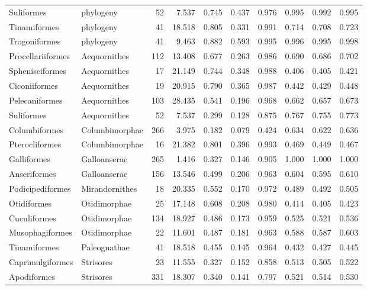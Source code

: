 \begin{longtable}{llrrrrrrrr}
  Suliformes & phylogeny &   52 & 7.537 & 0.745 & 0.437 & 0.976 & 0.995 & 0.992 & 0.995 \\ 
  Tinamiformes & phylogeny &   41 & 18.518 & 0.805 & 0.331 & 0.991 & 0.714 & 0.708 & 0.723 \\ 
  Trogoniformes & phylogeny &   41 & 9.463 & 0.882 & 0.593 & 0.995 & 0.996 & 0.995 & 0.998 \\ 
  Procellariiformes & Aequornithes &  112 & 13.408 & 0.677 & 0.263 & 0.986 & 0.690 & 0.686 & 0.702 \\ 
  Sphenisciformes & Aequornithes &   17 & 21.149 & 0.744 & 0.348 & 0.988 & 0.406 & 0.405 & 0.421 \\ 
  Ciconiiformes & Aequornithes &   19 & 20.915 & 0.790 & 0.365 & 0.987 & 0.442 & 0.429 & 0.448 \\ 
  Pelecaniformes & Aequornithes &  103 & 28.435 & 0.541 & 0.196 & 0.968 & 0.662 & 0.657 & 0.673 \\ 
  Suliformes & Aequornithes &   52 & 7.537 & 0.299 & 0.128 & 0.875 & 0.767 & 0.755 & 0.773 \\ 
  Columbiformes & Columbimorphae &  266 & 3.975 & 0.182 & 0.079 & 0.424 & 0.634 & 0.622 & 0.636 \\ 
  Pterocliformes & Columbimorphae &   16 & 21.382 & 0.801 & 0.396 & 0.993 & 0.469 & 0.449 & 0.467 \\ 
  Galliformes & Galloanserae &  265 & 1.416 & 0.327 & 0.146 & 0.905 & 1.000 & 1.000 & 1.000 \\ 
  Anseriformes & Galloanserae &  156 & 13.546 & 0.499 & 0.206 & 0.963 & 0.604 & 0.595 & 0.610 \\ 
  Podicipediformes & Mirandornithes &   18 & 20.335 & 0.552 & 0.170 & 0.972 & 0.489 & 0.492 & 0.505 \\ 
  Otidiformes & Otidimorphae &   25 & 17.148 & 0.608 & 0.208 & 0.980 & 0.414 & 0.405 & 0.423 \\ 
  Cuculiformes & Otidimorphae &  134 & 18.927 & 0.486 & 0.173 & 0.959 & 0.525 & 0.521 & 0.536 \\ 
  Musophagiformes & Otidimorphae &   22 & 11.601 & 0.487 & 0.181 & 0.963 & 0.588 & 0.587 & 0.603 \\ 
  Tinamiformes & Paleognathae &   41 & 18.518 & 0.455 & 0.145 & 0.964 & 0.432 & 0.427 & 0.445 \\ 
  Caprimulgiformes & Strisores &   23 & 11.555 & 0.327 & 0.152 & 0.858 & 0.513 & 0.505 & 0.522 \\ 
  Apodiformes & Strisores &  331 & 18.307 & 0.340 & 0.141 & 0.797 & 0.521 & 0.514 & 0.530 \\ 

\end{longtable}
